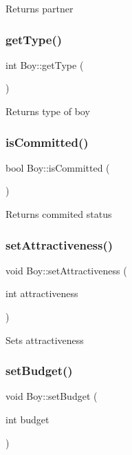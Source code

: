 Returns partner \mbox{\label{class_boy_a65dcb5946aa7d736f15d7ca8d892dab7}} 
\subsubsection{\texorpdfstring{get\+Type()}{getType()}}
{\footnotesize\ttfamily int Boy\+::get\+Type (\begin{DoxyParamCaption}{ }\end{DoxyParamCaption})}

Returns type of boy \mbox{\label{class_boy_a2aaabbf515640f59d44638b3ec7837b8}} 
\subsubsection{\texorpdfstring{is\+Committed()}{isCommitted()}}
{\footnotesize\ttfamily bool Boy\+::is\+Committed (\begin{DoxyParamCaption}{ }\end{DoxyParamCaption})}

Returns commited status \mbox{\label{class_boy_a402b2082685030f1484f1c9940f4e977}} 
\subsubsection{\texorpdfstring{set\+Attractiveness()}{setAttractiveness()}}
{\footnotesize\ttfamily void Boy\+::set\+Attractiveness (\begin{DoxyParamCaption}\item[{int}]{attractiveness }\end{DoxyParamCaption})}

Sets attractiveness \mbox{\label{class_boy_adb0aa7b4399c4d463129be2b2b9c3b42}} 
\subsubsection{\texorpdfstring{set\+Budget()}{setBudget()}}
{\footnotesize\ttfamily void Boy\+::set\+Budget (\begin{DoxyParamCaption}\item[{int}]{budget }\end{DoxyParamCaption})}

